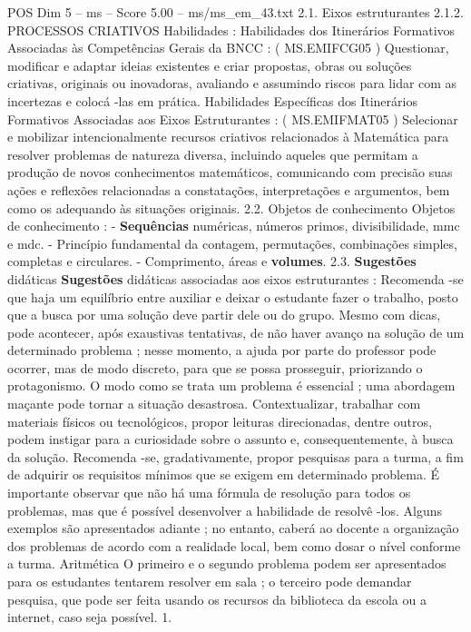 \begin{textsample}{POS Dim 5 – ms – Score 5.00 – ms/ms\_em\_43.txt}  \label{ex:f5_pos_219}
2.1.
Eixos estruturantes 2.1.2.
PROCESSOS CRIATIVOS Habilidades : Habilidades dos Itinerários Formativos Associadas às Competências Gerais da BNCC : ( MS.EMIFCG05 ) Questionar, modificar e adaptar ideias existentes e criar propostas, obras ou soluções criativas, originais ou inovadoras, avaliando e assumindo riscos para lidar com as incertezas e colocá -las em prática.
Habilidades Específicas dos Itinerários Formativos Associadas aos Eixos Estruturantes : ( MS.EMIFMAT05 ) Selecionar e mobilizar intencionalmente recursos criativos relacionados à Matemática para resolver problemas de natureza diversa, incluindo aqueles que permitam a produção de novos conhecimentos matemáticos, comunicando com precisão suas ações e reflexões relacionadas a constatações, interpretações e argumentos, bem como os adequando às situações originais. 2.2.
Objetos de conhecimento Objetos de conhecimento : - \textbf{Sequências} numéricas, números primos, divisibilidade, mmc e mdc. - Princípio fundamental da contagem, permutações, combinações simples, completas e circulares. - Comprimento, áreas e \textbf{volumes}. 2.3. \textbf{Sugestões} didáticas \textbf{Sugestões} didáticas associadas aos eixos estruturantes : Recomenda -se que haja um equilíbrio entre auxiliar e deixar o estudante fazer o trabalho, posto que a busca por uma solução deve partir dele ou do grupo.
Mesmo com dicas, pode acontecer, após exaustivas tentativas, de não haver avanço na solução de um determinado problema ; nesse momento, a ajuda por parte do professor pode ocorrer, mas de modo discreto, para que se possa prosseguir, priorizando o protagonismo.
O modo como se trata um problema é essencial ; uma abordagem maçante pode tornar a situação desastrosa.
Contextualizar, trabalhar com materiais físicos ou tecnológicos, propor leituras direcionadas, dentre outros, podem instigar para a curiosidade sobre o assunto e, consequentemente, à busca da solução.
Recomenda -se, gradativamente, propor pesquisas para a turma, a fim de adquirir os requisitos mínimos que se exigem em determinado problema.
É importante observar que não há uma fórmula de resolução para todos os problemas, mas que é possível desenvolver a habilidade de resolvê -los.
Alguns exemplos são apresentados adiante ; no entanto, caberá ao docente a organização dos problemas de acordo com a realidade local, bem como dosar o nível conforme a turma.
Aritmética O primeiro e o segundo problema podem ser apresentados para os estudantes tentarem resolver em sala ; o terceiro pode demandar pesquisa, que pode ser feita usando os recursos da biblioteca da escola ou a internet, caso seja possível. 1.

\end{textsample}
